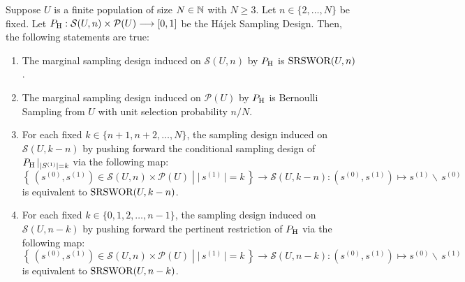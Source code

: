 \begin{lemma}
\label{HajekSamplingDesignProperties}
\mbox{}
\vskip 0.1cm
\noindent
Suppose $U$ is a finite population of size $N \in \mathbb{N}$ with $N \geq 3$.
Let $n \in \{2,\ldots,N\}$ be fixed.
Let $P_{\textnormal{H}} : \mathcal{S}(U,n) \times \mathcal{P}(U) \longrightarrow [0,1]$
be the H\'ajek Sampling Design.
Then, the following statements are true:
\begin{enumerate}
\item	The marginal sampling design induced on $\mathcal{S}(U,n)$ by $P_{\textnormal{H}}$ is
		$\textnormal{SRSWOR}(U,n)$.
\item	The marginal sampling design induced on $\mathcal{P}(U)$ by $P_{\textnormal{H}}$ is
		Bernoulli Sampling from $U$ with unit selection probability $n/N$.
\item	For each fixed $k \in \{n+1, n+2, \ldots, N\}$, the sampling design induced on $\mathcal{S}(U,k-n)$
		by pushing forward the conditional sampling design of $P_{\textnormal{H}}\,\vert_{|S^{(1)}| = k}$ via the following map:
		\begin{equation*}
		\left\{\,\left.
		\left(s^{(0)},s^{(1)}\right) \in \mathcal{S}(U,n) \times \mathcal{P}(U)
		\;\right\vert\;
		\vert\,s^{(1)}\,\vert = k
		\,\right\}
		\longrightarrow \mathcal{S}(U,k-n)
		:
		\left(s^{(0)},s^{(1)}\right) \longmapsto s^{(1)} \backslash\,s^{(0)}
		\end{equation*}
		is equivalent to $\textnormal{SRSWOR}(U,k-n)$.
\item	For each fixed $k \in \{0, 1, 2, \ldots, n-1\}$, the sampling design induced on $\mathcal{S}(U,n-k)$
		by pushing forward the pertinent restriction of $P_{\textnormal{H}}$ via the following map:
		\begin{equation*}
		\left\{\,\left.
		\left(s^{(0)},s^{(1)}\right) \in \mathcal{S}(U,n) \times \mathcal{P}(U)
		\;\right\vert\;
		\vert\,s^{(1)}\,\vert = k
		\,\right\}
		\longrightarrow \mathcal{S}(U,n-k)
		:
		\left(s^{(0)},s^{(1)}\right) \longmapsto s^{(0)} \backslash\,s^{(1)}
		\end{equation*}
		is equivalent to $\textnormal{SRSWOR}(U,n-k)$.
\end{enumerate}
\end{lemma}
\proof
